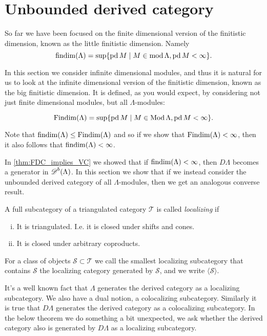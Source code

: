 \section{Unbounded derived category}\label{sec:Unbounded_derived_category}

So far we have been focused on the finite dimensional version of the finitistic dimension, known as the little finitistic dimension. Namely 
$$\operatorname{findim}(\Lambda) = \sup\{\operatorname{pd} M \mid M \in \operatorname{mod}\Lambda, \operatorname{pd} M < \infty\}.$$

In this section we consider infinite dimensional modules, and thus it is natural for us to look at the infinite dimensional version of the finitistic dimension, known as the big finitistic dimension. It is defined, as you would expect, by considering not just finite dimensional modules, but all $\Lambda$-modules:

$$\operatorname{Findim}(\Lambda) = \sup\{\operatorname{pd} M \mid M \in \operatorname{Mod}\Lambda, \operatorname{pd} M < \infty\}.$$

Note that $\operatorname{findim}(\Lambda) \leq \operatorname{Findim}(\Lambda)$ and so if we show that $\operatorname{Findim}(\Lambda) < \infty$, then it also follows that $\operatorname{findim}(\Lambda) < \infty$.

In \cref{thm:FDC_implies_VC} we showed that if $\operatorname{findim}(\Lambda) < \infty$, then $D\Lambda$ becomes a generator in $\operatorname{\mathscr{D}}^b(\Lambda)$. In this section we show that if we instead consider the unbounded derived category of all $\Lambda$-modules, then we get an analogous converse result.

\begin{defn}
	A full subcategory of a triangulated category $\mathcal T$ is called \emph{localizing} if
	\begin{enumerate}[i)]
		\item It is triangulated. I.e. it is closed under shifts and cones.
		\item It is closed under arbitrary coproducts.
	\end{enumerate}
	For a class of objects $\mathcal S \subset \mathcal T$ we call the smallest localizing subcategory that contains $\mathcal S$ the localizing category generated by $\mathcal S$, and we write $\langle \mathcal S \rangle$.
\end{defn}

It's a well known fact that $\Lambda$ generates the derived category as a localizing subcategory. We also have a dual notion, a colocalizing subcategory. Similarly it is true that $D\Lambda$ generates the derived category as a colocalizing subcategory. In the below theorem we do something a bit unexpected, we ask whether the derived category also is generated by $D\Lambda$ as a localizing subcategory.

